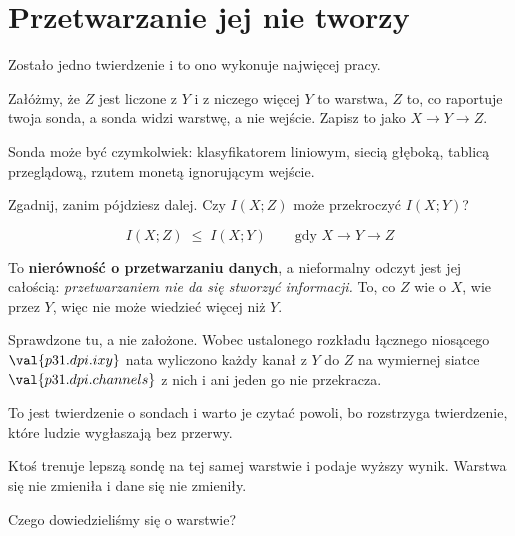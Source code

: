 \section{Przetwarzanie jej nie tworzy}
\label{sec:P31-dpi}

\begin{fr}
Zostało jedno twierdzenie i to ono wykonuje najwięcej pracy.

Załóżmy, że $Z$ jest liczone z $Y$ i z niczego więcej \dash{} $Y$ to
warstwa, $Z$ to, co raportuje twoja sonda, a sonda widzi warstwę, a nie
wejście. Zapisz to jako $X \to Y \to Z$.

Sonda może być czymkolwiek: klasyfikatorem liniowym, siecią głęboką, tablicą
przeglądową, rzutem monetą ignorującym wejście.

Zgadnij, zanim pójdziesz dalej. Czy $I(X; Z)$ może przekroczyć $I(X; Y)$?
\dotline
\nextframe
\end{fr}

\begin{fr}

\[ I(X; Z) \;\le\; I(X; Y) \qquad \text{gdy } X \to Y \to Z \]

To \textbf{nierówność o przetwarzaniu danych}, a nieformalny odczyt jest jej
całością: \emph{przetwarzaniem nie da się stworzyć informacji.} To, co $Z$
wie o $X$, wie przez $Y$, więc nie może wiedzieć więcej niż $Y$.

Sprawdzone tu, a nie założone. Wobec ustalonego rozkładu łącznego niosącego
$\val{p31.dpi.ixy}$ nata wyliczono każdy kanał z $Y$ do $Z$ na wymiernej
siatce \dash{} $\val{p31.dpi.channels}$ z nich \dash{} i ani jeden go nie
przekracza.
\end{fr}

\begin{fr}
To jest twierdzenie o sondach i warto je czytać powoli, bo rozstrzyga
twierdzenie, które ludzie wygłaszają bez przerwy.

Ktoś trenuje lepszą sondę na tej samej warstwie i podaje wyższy wynik.
Warstwa się nie zmieniła i dane się nie zmieniły.

Czego dowiedzieliśmy się o warstwie?
\dotline
\nextframe
\end{fr}

